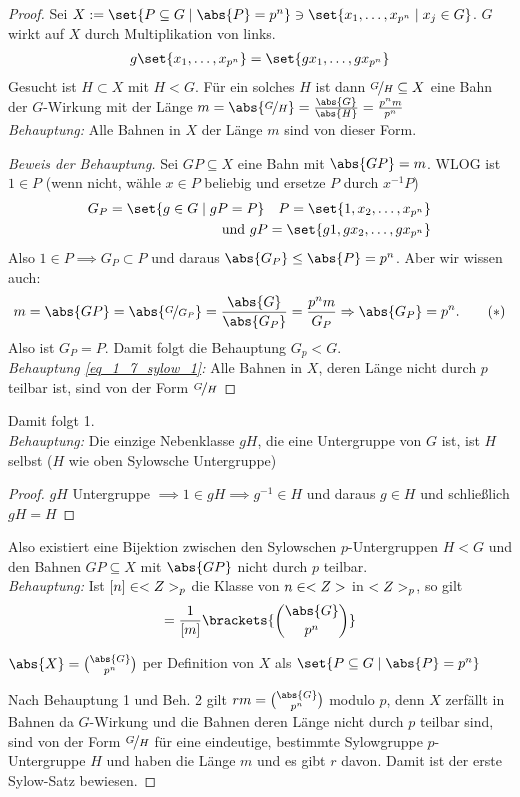 \begin{proof}
	Sei $X := \set{P \subseteq G \mid \abs{P} = p^n} \ni \set{x_1, \dots, x_{p^n} \mid x_j \in G}$. $G$ wirkt auf $X$ durch Multiplikation von links.
	\begin{align*}
		g \set{x_1, \dots, x_{p^n}} = \set{gx_1, \dots, gx_{p^n}}
	\end{align*}
	Gesucht ist $H \subset X$ mit $H < G$. Für ein solches $H$ ist dann $\lnkset{G}{H} \subseteq X$ eine Bahn der $G$-Wirkung mit der Länge $m = \abs{\lnkset{G}{H}} = \frac{\abs{G}}{\abs{H}} = \frac{p^n m}{p^n}$\\
	\emph{Behauptung:} Alle Bahnen in $X$ der Länge $m$ sind von dieser Form.
	\begin{proof}[Beweis der Behauptung]
		Sei $GP \subseteq X$ eine Bahn mit $\abs{GP} = m$. WLOG ist $1 \in P$ (wenn nicht, wähle $x \in P$ beliebig und ersetze $P$ durch $x^{-1}P$)
		\begin{align*}
			G_P = \set{g \in G \mid gP = P}\quad P = \set{1, x_2, \dots, x_{p^n}}\\
			\und gP = \set{g1, gx_2, \dots, gx_{p^n}}
		\end{align*}
		Also $1 \in P \implies G_P \subset P$ und daraus $\abs{G_P} \le \abs{P} = p^n$. Aber wir wissen auch:
		\begin{align*}
			m = \abs{GP} = \abs{\lnkset{G}{G_P}} = \frac{\abs{G}}{\abs{G_P}} = \frac{p^n m}{G_P} \implies \abs{G_P} = p^n.\tag{$\ast$}\label{eq_1_7_sylow_1}
		\end{align*}
		Also ist $G_P = P$. Damit folgt die Behauptung $G_p < G$.\\
		\emph{Behauptung \eqref{eq_1_7_sylow_1}:} Alle Bahnen in $X$, deren Länge nicht durch $p$ teilbar ist, sind von der Form $\lnkset{G}{H}$
	\end{proof}
	Damit folgt 1.\\
	\emph{Behauptung:} Die einzige Nebenklasse $gH$, die eine Untergruppe von $G$ ist, ist $H$ selbst ($H$ wie oben Sylowsche Untergruppe)
	\begin{proof}
		$gH$ Untergruppe $\implies 1 \in gH \implies g^{-1} \in H$ und daraus $g \in H$ und schließlich $gH = H$
	\end{proof}
	Also existiert eine Bijektion zwischen den Sylowschen $p$-Untergruppen $H < G$ und den Bahnen $GP \subseteq X$ mit $\abs{GP}$ nicht durch $p$ teilbar.\\
	\emph{Behauptung:} Ist $[n]\in <Z>_p$ die Klasse von $n \in <Z>$ in $<Z>_p$, so gilt
	\begin{align*}
		[r] = \frac{1}{[m]}\brackets{\binom{\abs{G}}{p^n}}
	\end{align*}
	\begin{*remark}
		$\abs{X} = \binom{\abs{G}}{p^n}$ per Definition von $X$ als $\set{P \subseteq G \mid \abs{P} = p^n}$
	\end{*remark}
	Nach Behauptung 1 und Beh. 2 gilt $rm = \binom{\abs{G}}{p^n}$ modulo $p$, denn $X$ zerfällt in Bahnen da $G$-Wirkung und die Bahnen deren Länge nicht durch $p$ teilbar sind, sind von der Form $\lnkset{G}{H}$ für eine eindeutige, bestimmte Sylowgruppe $p$-Untergruppe $H$ und haben die Länge $m$ und es gibt $r$ davon. Damit ist der erste Sylow-Satz bewiesen.	
\end{proof}